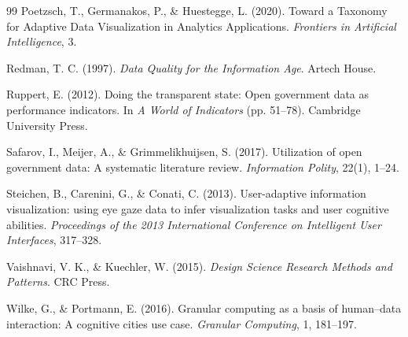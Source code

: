 \documentclass[Afour,times,sageh]{sagej}
\begin{document}
\begin{thebibliography}{99}
 Poetzsch, T., Germanakos, P., \& Huestegge, L. (2020).
 \newblock Toward a Taxonomy for Adaptive Data Visualization in Analytics Applications.
 \newblock \textit{Frontiers in Artificial Intelligence}, 3.
 \newblock {}

Redman, T. C. (1997).
\newblock \textit{Data Quality for the Information Age}.
\newblock Artech House.

Ruppert, E. (2012).
\newblock Doing the transparent state: Open government data as performance indicators.
\newblock In \textit{A World of Indicators} (pp. 51--78). Cambridge University Press.

Safarov, I., Meijer, A., \& Grimmelikhuijsen, S. (2017).
\newblock Utilization of open government data: A systematic literature review.
\newblock \textit{Information Polity}, 22(1), 1--24.

 Steichen, B., Carenini, G., \& Conati, C. (2013).
 \newblock User-adaptive information visualization: using eye gaze data to infer visualization tasks and user cognitive abilities.
 \newblock \textit{Proceedings of the 2013 International Conference on Intelligent User Interfaces}, 317--328.
 \newblock {}

Vaishnavi, V. K., \& Kuechler, W. (2015).
\newblock \textit{Design Science Research Methods and Patterns}.
\newblock CRC Press.


Wilke, G., \& Portmann, E. (2016).
\newblock Granular computing as a basis of human--data interaction: A cognitive cities use case.
\newblock \textit{Granular Computing}, 1, 181--197.





\end{thebibliography}
\end{document}
